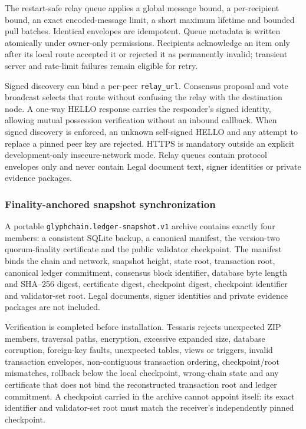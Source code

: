 The restart-safe relay queue applies a global message bound, a per-recipient
bound, an exact encoded-message limit, a short maximum lifetime and bounded
pull batches. Identical envelopes are idempotent. Queue metadata is written
atomically under owner-only permissions. Recipients acknowledge an item only
after its local route accepted it or rejected it as permanently invalid;
transient server and rate-limit failures remain eligible for retry.

Signed discovery can bind a per-peer \texttt{relay\_url}. Consensus proposal
and vote broadcast selects that route without confusing the relay with the
destination node. A one-way HELLO response carries the responder's signed
identity, allowing mutual possession verification without an inbound callback.
When signed discovery is enforced, an unknown self-signed HELLO and any attempt
to replace a pinned peer key are rejected. HTTPS is mandatory outside an
explicit development-only insecure-network mode. Relay queues contain protocol
envelopes only and never contain Legal document text, signer identities or
private evidence packages.

\subsubsection{Finality-anchored snapshot synchronization}

A portable \texttt{glyphchain.ledger-snapshot.v1} archive contains exactly four
members: a consistent SQLite backup, a canonical manifest, the version-two
quorum-finality certificate and the public validator checkpoint. The manifest
binds the chain and network, snapshot height, state root, transaction root,
canonical ledger commitment, consensus block identifier, database byte length
and SHA--256 digest, certificate digest, checkpoint digest, checkpoint
identifier and validator-set root. Legal documents, signer identities and
private evidence packages are not included.

Verification is completed before installation. Tessaris rejects unexpected ZIP
members, traversal paths, encryption, excessive expanded size, database
corruption, foreign-key faults, unexpected tables, views or triggers, invalid
transaction envelopes, non-contiguous transaction ordering, checkpoint/root
mismatches, rollback below the local checkpoint, wrong-chain state and any
certificate that does not bind the reconstructed transaction root and ledger
commitment. A checkpoint carried in the archive cannot appoint itself: its exact
identifier and validator-set root must match the receiver's independently pinned
checkpoint.


